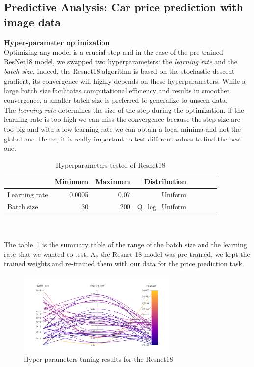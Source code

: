 \documentclass[12pt]{article}
\begin{document}
\subsection{Predictive Analysis: Car price prediction with image data}
 
\noindent \textbf{Hyper-parameter optimization} \\
\noindent Optimizing any model is a crucial step and in the case of the pre-trained ResNet18 model, we swapped two hyperparameters: the \textit{learning rate} and the \textit{batch size}. Indeed, the Resnet18 algorithm is based on the stochastic descent gradient, its convergence will highly depends on these hyperparameters. While a large batch size facilitates computational efficiency and results in smoother convergence, a smaller batch size is preferred to generalize to unseen data.\\

\noindent The \textit{learning rate} determines the size of the step during the optimization. If the learning rate is too high we can miss the convergence because the step size are too big and with a low learning rate we can obtain a local minima and not the global one. Hence, it is really important to test different values to find the best one.


\FloatBarrier
\begin{table}[h]
    \centering
    \caption{Hyperparameters tested of Resnet18}
    \begin{tabular}{lrrrrrrr}
    \toprule
           & Minimum & Maximum & Distribution \\
    \midrule
     Learning rate & 0.0005 & 0.07 & Uniform  \\
     Batch size & 30 & 200 & Q\_log\_Uniform  \\
    \bottomrule
     \label{hyperparameters test CNN}
    \end{tabular}
\end{table} \\ [0.1 cm]
\FloatBarrier

\noindent The table~\ref{hyperparameters test CNN} is the summary table of the range of the batch size and the learning rate that we wanted to test. As the Resnet-18 model was pre-trained, we kept the trained weights and re-trained them with our data for the price prediction task.

\FloatBarrier
\begin{figure}[ht]
    \centering
    \includegraphics[width=0.7\textwidth]{cnn_wandb.png}
    \caption{Hyper parameters tuning results for the Resnet18}
    \label{Tuning CNN}
\end{figure}
\FloatBarrier
\end{document}
